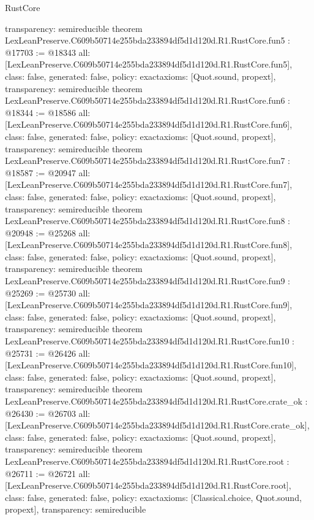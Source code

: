 \begin{lexlean}{RustCore}
\begin{coremodule}
{  transparency: semireducible
}
theorem LexLeanPreserve.C609b50714e255bda233894df5d1d120d.R1.RustCore.fun5 : @17703 := @18343 {
  all: [LexLeanPreserve.C609b50714e255bda233894df5d1d120d.R1.RustCore.fun5],
  class: false,
  generated: false,
  policy: exact{axioms: [Quot.sound, propext]},
  transparency: semireducible
}
theorem LexLeanPreserve.C609b50714e255bda233894df5d1d120d.R1.RustCore.fun6 : @18344 := @18586 {
  all: [LexLeanPreserve.C609b50714e255bda233894df5d1d120d.R1.RustCore.fun6],
  class: false,
  generated: false,
  policy: exact{axioms: [Quot.sound, propext]},
  transparency: semireducible
}
theorem LexLeanPreserve.C609b50714e255bda233894df5d1d120d.R1.RustCore.fun7 : @18587 := @20947 {
  all: [LexLeanPreserve.C609b50714e255bda233894df5d1d120d.R1.RustCore.fun7],
  class: false,
  generated: false,
  policy: exact{axioms: [Quot.sound, propext]},
  transparency: semireducible
}
theorem LexLeanPreserve.C609b50714e255bda233894df5d1d120d.R1.RustCore.fun8 : @20948 := @25268 {
  all: [LexLeanPreserve.C609b50714e255bda233894df5d1d120d.R1.RustCore.fun8],
  class: false,
  generated: false,
  policy: exact{axioms: [Quot.sound, propext]},
  transparency: semireducible
}
theorem LexLeanPreserve.C609b50714e255bda233894df5d1d120d.R1.RustCore.fun9 : @25269 := @25730 {
  all: [LexLeanPreserve.C609b50714e255bda233894df5d1d120d.R1.RustCore.fun9],
  class: false,
  generated: false,
  policy: exact{axioms: [Quot.sound, propext]},
  transparency: semireducible
}
theorem LexLeanPreserve.C609b50714e255bda233894df5d1d120d.R1.RustCore.fun10 : @25731 := @26426 {
  all: [LexLeanPreserve.C609b50714e255bda233894df5d1d120d.R1.RustCore.fun10],
  class: false,
  generated: false,
  policy: exact{axioms: [Quot.sound, propext]},
  transparency: semireducible
}
theorem LexLeanPreserve.C609b50714e255bda233894df5d1d120d.R1.RustCore.crate_ok : @26430 := @26703 {
  all: [LexLeanPreserve.C609b50714e255bda233894df5d1d120d.R1.RustCore.crate_ok],
  class: false,
  generated: false,
  policy: exact{axioms: [Quot.sound, propext]},
  transparency: semireducible
}
theorem LexLeanPreserve.C609b50714e255bda233894df5d1d120d.R1.RustCore.root : @26711 := @26721 {
  all: [LexLeanPreserve.C609b50714e255bda233894df5d1d120d.R1.RustCore.root],
  class: false,
  generated: false,
  policy: exact{axioms: [Classical.choice, Quot.sound, propext]},
  transparency: semireducible
}


\end{coremodule}
\end{lexlean}
